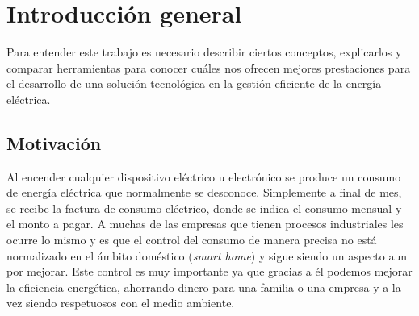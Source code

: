 
\chapter{Introducción general} %

\label{Chapter1} %
\label{IntroGeneral}
Para entender este trabajo es necesario describir ciertos conceptos, explicarlos y comparar herramientas para conocer cuáles nos ofrecen mejores prestaciones para el desarrollo de una solución tecnológica en la gestión eficiente de la energía eléctrica. 

\newcommand{\keyword}[1]{\textbf{#1}}
\newcommand{\tabhead}[1]{\textbf{#1}}
\newcommand{\code}[1]{\texttt{#1}}
\newcommand{\file}[1]{\texttt{\bfseries#1}}
\newcommand{\option}[1]{\texttt{\itshape#1}}
\newcommand{\grados}{$^{\circ}$}



\section{Motivación}
Al encender cualquier dispositivo eléctrico u electrónico se produce un consumo de energía eléctrica que normalmente se desconoce. Simplemente a final de mes, se recibe la factura de consumo eléctrico, donde se indica el consumo mensual y el monto a pagar. A muchas de las empresas que tienen procesos industriales les ocurre lo mismo y es que el control del consumo de manera precisa no está normalizado en el ámbito doméstico (\emph{smart home}) y sigue siendo un aspecto aun por mejorar. Este control es muy importante ya que gracias a él podemos mejorar la eficiencia energética, ahorrando dinero para una familia o una empresa y a la vez siendo respetuosos con el medio ambiente.

